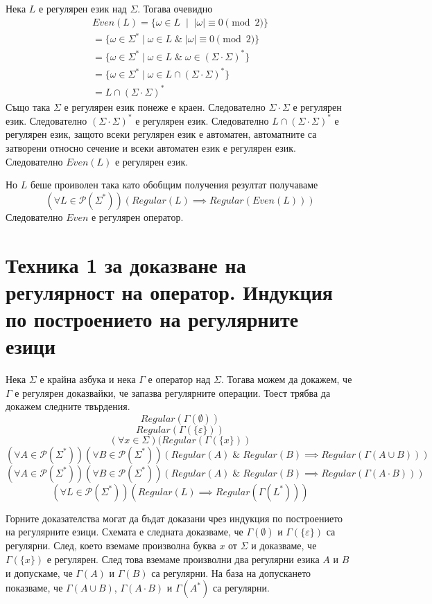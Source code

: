 \documentclass[12pt]{article}
\begin{document}
\par Нека \(L\) е регулярен език над \(\Sigma\).
Тогава очевидно
\begin{align*}
    Even(L) = \{\omega \in L \; \mid \; |\omega| \equiv 0 \pmod{2}\} \\
    = \{\omega \in \Sigma^* \mid \omega \in L \;\&\; |\omega| \equiv 0 \pmod{2}\} \\
    = \{\omega \in \Sigma^* \mid \omega \in L \;\&\; \omega \in (\Sigma \cdot \Sigma)^*\} \\
    = \{\omega \in \Sigma^* \mid \omega \in L \cap (\Sigma \cdot \Sigma)^*\} \\
    = L \cap (\Sigma \cdot \Sigma)^*
\end{align*}
Също така \(\Sigma\) е регулярен език понеже е краен.
Следователно \(\Sigma \cdot \Sigma\) е регулярен език.
Следователно \((\Sigma \cdot \Sigma)^*\) е регулярен език.
Следователно \(L \cap (\Sigma \cdot \Sigma)^*\) е регулярен език,
защото всеки регулярен език е автоматен, автоматните са затворени относно сечение и всеки автоматен език е регулярен език.
Следователно \(Even(L)\) е регулярен език.

Но \(L\) беше проиволен така като обобщим получения резултат получаваме
\[(\forall L \in \mathcal{P}(\Sigma^*))(Regular(L) \implies Regular(Even(L)) )\]
Следователно \(Even\) е регулярен оператор.

\section*{Техника 1 за доказване на регулярност на оператор. Индукция по построението на регулярните езици}
Нека \(\Sigma\) е крайна азбука и нека \(\Gamma\) е оператор над \(\Sigma\).
Тогава можем да докажем, че \(\Gamma\) е регулярен доказвайки, че запазва регулярните операции.
Тоест трябва да докажем следните твърдения.
\[Regular(\Gamma(\emptyset))\]
\[Regular(\Gamma(\{\varepsilon\}))\]
\[(\forall x \in \Sigma)(Regular(\Gamma(\{x\}))\]
\[(\forall A \in \mathcal{P}(\Sigma^*))(\forall B \in \mathcal{P}(\Sigma^*))(Regular(A) \;\&\; Regular(B) \implies  Regular(\Gamma(A \cup B)))\]
\[(\forall A \in \mathcal{P}(\Sigma^*))(\forall B \in \mathcal{P}(\Sigma^*))(Regular(A) \;\&\; Regular(B) \implies  Regular(\Gamma(A \cdot B)))\]
\[(\forall L \in \mathcal{P}(\Sigma^*))(Regular(L) \implies  Regular(\Gamma(L^*)))\]

Горните доказателства могат да бъдат доказани чрез индукция по построението на регулярните езици.
Схемата е следната доказваме, че
\(\Gamma(\emptyset)\) и \(\Gamma(\{\varepsilon\})\) са регулярни.
След, което вземаме произволна буква \(x\) от \(\Sigma\) и доказваме, че \(\Gamma(\{x\})\) е регулярен.
След това вземаме произволни два регулярни езика \(A\) и \(B\) и допускаме, че \(\Gamma(A)\) и \(\Gamma(B)\) са регулярни.
На база на допускането показваме, че \(\Gamma(A \cup B)\), \(\Gamma(A \cdot B)\) и \(\Gamma(A^*)\) са регулярни.
\end{document}
